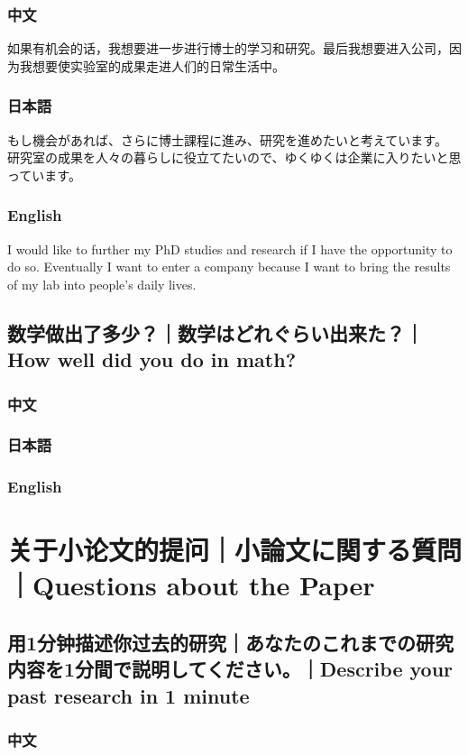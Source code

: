 \documentclass[lang=cn,11pt,a4paper]{elegantpaper}
\begin{document}
\subsubsection{中文}
如果有机会的话，我想要进一步进行博士的学习和研究。最后我想要进入公司，因为我想要使实验室的成果走进人们的日常生活中。
\subsubsection{日本語}
もし機会があれば、さらに博士課程に進み、研究を進めたいと考えています。 研究室の成果を人々の暮らしに役立てたいので、ゆくゆくは企業に入りたいと思っています。
\subsubsection{English}
I would like to further my PhD studies and research if I have the opportunity to do so. Eventually I want to enter a company because I want to bring the results of my lab into people's daily lives.

\subsection{数学做出了多少？｜数学はどれぐらい出来た？｜How well did you do in math?}
\subsubsection{中文}
\subsubsection{日本語}
\subsubsection{English}

\section{关于小论文的提问｜小論文に関する質問｜Questions about the Paper}
\subsection{用1分钟描述你过去的研究｜あなたのこれまでの研究内容を1分間で説明してください。｜Describe your past research in 1 minute}
\subsubsection{中文}
\end{document}

